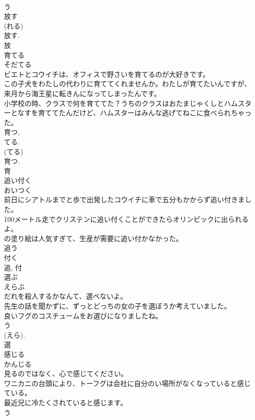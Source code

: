 \documentclass[8pt]{extreport}
\begin{document}
\begin{CJK}{UTF8}{min}
\\	う 
\\	放す 
\\	(れる) 
\\	放す. 
\\	放	
\\	育てる	
\\	そだてる	
\\	ビエトとコウイチは、オフィスで野さいを育てるのが大好きです。	
\\	この子犬をわたしの代わりに育ててくれませんか。わたしが育てたいんですが、来月から海王星に転きんになってしまったんです。	
\\	小学校の時、クラスで何を育ててた？うちのクラスはおたまじゃくしとハムスターとなすを育ててたんだけど、ハムスターはみんな逃げてねこに食べられちゃった。	
\\	育つ, 
\\	てる. 
\\	(てる) 
\\	育つ. 
\\	育	
\\	追い付く	
\\	おいつく	
\\	前日にシアトルまでと歩で出発したコウイチに車で五分もかからず追い付きました。	
\\	100メートル走でクリステンに追い付くことができたらオリンピックに出られるよ。	
\\	の塗り絵は人気すぎて、生産が需要に追い付かなかった。	
\\	追う 
\\	付く 
\\	追, 付	
\\	選ぶ	
\\	えらぶ	
\\	だれを殺人するかなんて、選べないよ。	
\\	先生の話を聞かずに、ずっとどっちの女の子を選ぼうか考えていました。	
\\	良いフグのコスチュームをお選びになりましたね。	
\\	う 
\\	(えら).
\\	選	
\\	感じる	
\\	かんじる	
\\	見るのではなく、心で感じてください。	
\\	ワニカニの台頭により、トーフグは会社に自分のい場所がなくなっていると感じている。	
\\	最近兄に冷たくされていると感じます。	
\\	う 

\end{CJK}
\end{document}
